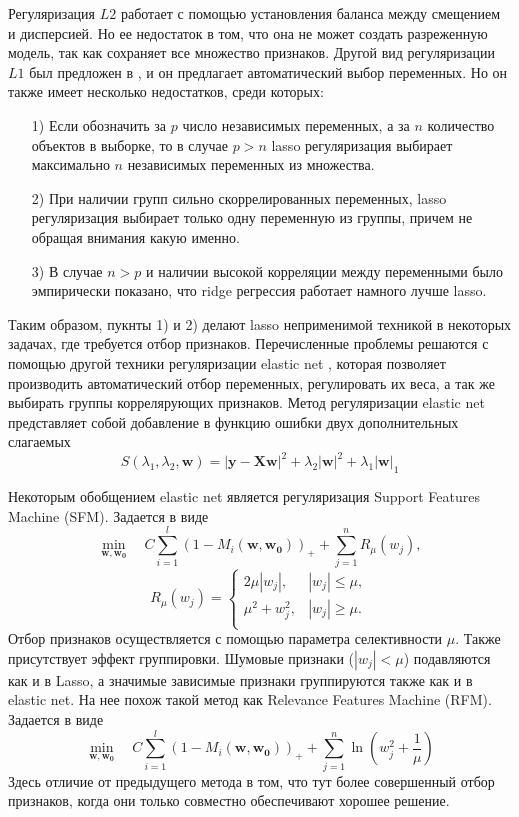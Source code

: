 \documentclass[12pt, twoside]{article}
\newcommand{\xmatr}{{\mathbf{X}}}
\newcommand{\yb}{{\mathbf{y}}}
\newcommand{\wm}{{\mathbf{w}}}
\begin{document}
Регуляризация $L2$ работает с помощью установления баланса между смещением и дисперсией. Но ее недостаток в том, что она не может создать разреженную модель, так как сохраняет все множество признаков. Другой вид регуляризации $L1$ был предложен в \cite{tibshirani1996regression}, и он предлагает автоматический выбор переменных. Но он также имеет несколько недостатков, среди которых:
\begin{enumerate}
\item[1)]
Если обозначить за $p$ число независимых переменных, а за $n$ количество объектов в выборке, то в случае $p>n$ lasso регуляризация выбирает максимально $n$ независимых переменных из множества.
\item[2)]
При наличии групп сильно скоррелированных переменных, lasso регуляризация выбирает только одну переменную из группы, причем не обращая внимания какую именно.
\item[3)]
В случае $n>p$ и наличии высокой корреляции между переменными было эмпирически показано, что ridge регрессия работает намного лучше lasso.
\end{enumerate}
Таким образом, пукнты 1) и 2) делают lasso неприменимой техникой в некоторых задачах, где требуется отбор признаков. Перечисленные проблемы решаются с помощью другой техники регуляризации elastic net \cite{zou2005regularization}, которая позволяет производить автоматический отбор переменных, регулировать их веса, а так же выбирать группы коррелярующих признаков. Метод регуляризации elastic net представляет собой добавление в функцию ошибки двух дополнительных слагаемых
\begin{equation}
S(\lambda_1,\lambda_2,\wm) = |\yb-\xmatr\wm|^2+\lambda_2|\wm|^2+\lambda_1|\wm|_1
\end{equation}

Некоторым обобщением elastic net является регуляризация Support Features Machine (SFM). Задается в виде
\begin{equation}
\underset{\mathbf{w},\mathbf{w_0}}\min\quad C\sum_{i=1}^l(1 - M_i(\mathbf{w},\mathbf{w_0}))_+ + \sum_{j=1}^nR_{\mu}(w_j),
\end{equation}
\begin{equation}
R_{\mu}(w_j) = \begin{cases}
2\mu|w_j|,& |w_j| \leq \mu, \\
\mu^2 + w_j^2,& |w_j| \geq \mu. \\
\end{cases}
\end{equation}
Отбор признаков осуществляется с помощью параметра селективности $\mu$. Также присутствует эффект группировки. Шумовые признаки ($|w_j| < \mu$) подавляются как и в Lasso, а значимые зависимые признаки группируются также как и в elastic net.
На нее похож такой метод как Relevance Features Machine (RFM). Задается в виде
\begin{equation}
\underset{\mathbf{w},\mathbf{w_0}}\min\quad C\sum_{i=1}^l(1 - M_i(\mathbf{w},\mathbf{w_0}))_+ + \sum_{j=1}^n\ln(w_j^2 + \frac{1}{\mu})
\end{equation}
Здесь отличие от предыдущего метода в том, что тут более совершенный отбор признаков, когда они только совместно обеспечивают хорошее решение.
\end{document}
